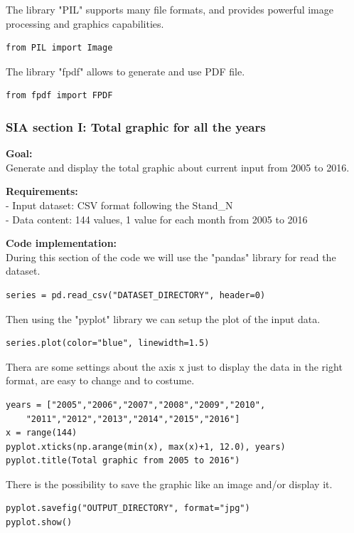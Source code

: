 The library "PIL" supports many file formats, and provides powerful image processing and graphics capabilities.
\begin{lstlisting}
from PIL import Image
\end{lstlisting}

The library "fpdf" allows to generate and use PDF file.
\begin{lstlisting}
from fpdf import FPDF
\end{lstlisting}
\newpage
\subsubsection{SIA section I: Total graphic for all the years}
\textbf{Goal:}\\
Generate and display the total graphic about current input from 2005 to 2016.

\textbf{Requirements:}\\
- Input dataset: CSV format following the Stand\_N \\
- Data content: 144 values, 1 value for each month from 2005 to 2016

\textbf{Code implementation:}\\
During this section of the code we will use the "pandas" library for read the dataset.
\begin{lstlisting}
series = pd.read_csv("DATASET_DIRECTORY", header=0)
\end{lstlisting}

Then using the "pyplot" library we can setup the plot of the input data.
\begin{lstlisting}
series.plot(color="blue", linewidth=1.5)
\end{lstlisting}


Thera are some settings about the axis x just to display the data in the right format, are easy to change and to costume.
\begin{lstlisting}
years = ["2005","2006","2007","2008","2009","2010",
	"2011","2012","2013","2014","2015","2016"]
x = range(144)
pyplot.xticks(np.arange(min(x), max(x)+1, 12.0), years)
pyplot.title(Total graphic from 2005 to 2016")
\end{lstlisting}

There is the possibility to save the graphic like an image and/or display it.
\begin{lstlisting}
pyplot.savefig("OUTPUT_DIRECTORY", format="jpg")
pyplot.show()
\end{lstlisting}




